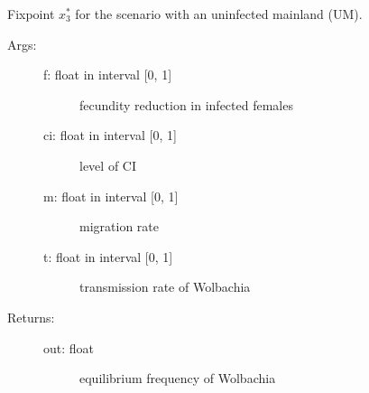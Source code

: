 \documentclass[letterpaper,10pt,english]{sphinxmanual}
\begin{document}
\begin{fulllineitems}
\label{index:wspec.analytical.fix3_UM}
Fixpoint $x_3^{\ast}$ for the scenario with an uninfected mainland (UM).
\begin{description}
\item[{Args:}] \leavevmode\begin{description}
\item[{f: float in interval {[}0, 1{]}}] \leavevmode
fecundity reduction in infected females

\item[{ci: float in interval {[}0, 1{]}}] \leavevmode
level of CI

\item[{m: float in interval {[}0, 1{]}}] \leavevmode
migration rate

\item[{t: float in interval {[}0, 1{]}}] \leavevmode
transmission rate of Wolbachia

\end{description}

\item[{Returns:}] \leavevmode\begin{description}
\item[{out: float}] \leavevmode
equilibrium frequency of Wolbachia

\end{description}

\end{description}

\end{fulllineitems}

\end{document}
